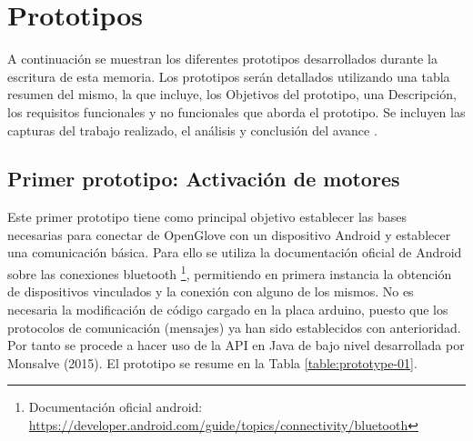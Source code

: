 \section{Prototipos}
\label{seccion-prototipos}
A continuación se muestran los diferentes prototipos desarrollados durante la escritura de esta memoria. Los prototipos serán detallados utilizando una tabla resumen del mismo, la que incluye, los Objetivos del prototipo, una Descripción, los requisitos funcionales y no funcionales que aborda el prototipo.  Se incluyen las capturas del trabajo realizado, el análisis y conclusión del avance .


\subsection{Primer prototipo: Activación de motores}
\label{primer-prototipo}
Este primer prototipo tiene como principal objetivo establecer las bases necesarias para conectar de OpenGlove con un dispositivo Android y establecer una comunicación básica. Para ello se utiliza la documentación oficial de Android sobre las conexiones bluetooth \footnote{Documentación oficial android: \url{https://developer.android.com/guide/topics/connectivity/bluetooth}}, permitiendo en primera instancia la obtención de dispositivos vinculados y la conexión con alguno de los mismos. No es necesaria la modificación de código cargado en la placa arduino, puesto que los protocolos de comunicación (mensajes) ya han sido establecidos con anterioridad. Por tanto se procede a hacer uso de la API en Java de bajo nivel desarrollada por Monsalve (2015). El prototipo se resume en la Tabla \ref{table:prototype-01}.


